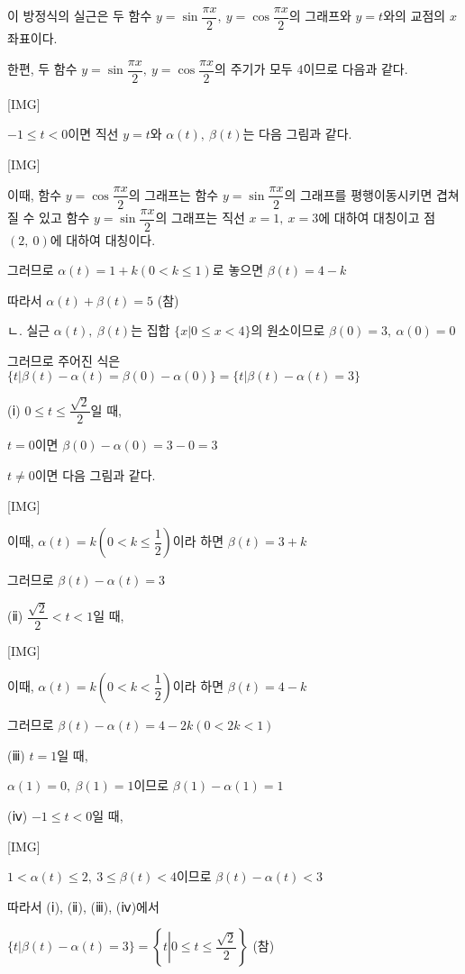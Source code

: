 \documentclass{oblivoir}
\begin{document}
이 방정식의 실근은 두 함수 $y=\sin\dfrac{\pi x}{2},\:y=\cos\dfrac{\pi x}{2}$의 그래프와 $y=t$와의 교점의 $x$좌표이다.

한편, 두 함수 $y=\sin\dfrac{\pi x}{2},\:y=\cos\dfrac{\pi x}{2}$의 주기가 모두 $4$이므로 다음과 같다.

[IMG]

$-1\le t< 0$이면 직선 $y=t$와 $\alpha(t),\:\beta(t)$는 다음 그림과 같다.

[IMG]

이때, 함수 $y=\cos\dfrac{\pi x}{2}$의 그래프는 함수 $y=\sin\dfrac{\pi x}{2}$의 그래프를 평행이동시키면 겹쳐질 수 있고 함수 $y=\sin\dfrac{\pi x}{2}$의 그래프는 직선 $x=1,\:x=3$에 대하여 대칭이고 점 $(2,\:0)$에 대하여 대칭이다.

그러므로 $\alpha(t)=1+k(0< k\le 1)$로 놓으면 $\beta(t)=4-k$

따라서 $\alpha(t)+\beta(t)=5$ (참)

ㄴ. 실근 $\alpha(t),\:\beta(t)$는 집합 $\{x\vert  0\le x< 4\}$의 원소이므로 $\beta(0)=3,\:\alpha(0)=0$

그러므로 주어진 식은 $\{t\vert \beta(t)-\alpha(t)=\beta(0)-\alpha(0)\}=\{t\vert \beta(t)-\alpha(t)=3\}$

(ⅰ) $0\le t\le\dfrac{\sqrt{2}}{2}$일 때,

$t=0$이면 $\beta(0)-\alpha(0)=3-0=3$

$t\ne 0$이면 다음 그림과 같다.

[IMG]

이때,    $\alpha(t)=k\left(0< k\le\dfrac{1}{2}\right)$이라 하면 $\beta(t)=3+k$

그러므로 $\beta(t)-\alpha(t)=3$

(ⅱ) $\dfrac{\sqrt{2}}{2}< t< 1$일 때,

[IMG]

이때, $\alpha(t)=k\left(0< k< \dfrac{1}{2}\right)$이라 하면 $\beta(t)=4-k$

그러므로 $\beta(t)-\alpha(t)=4-2k(0< 2k< 1)$

(ⅲ) $t=1$일 때,

$\alpha(1)=0,\:\beta(1)=1$이므로 $\beta(1)-\alpha(1)=1$

(ⅳ) $-1\le t< 0$일 때,

[IMG]

$1< \alpha(t)\le 2,\:3\le\beta(t)< 4$이므로 $\beta(t)-\alpha(t)< 3$

따라서 (ⅰ), (ⅱ), (ⅲ), (ⅳ)에서

$\{t \left| \beta(t)-\alpha(t)=3 \right. \}=\left\{t \left| 0\le t\le\dfrac{\sqrt{2}}{2} \right. \right\}$ (참)
\end{document}
